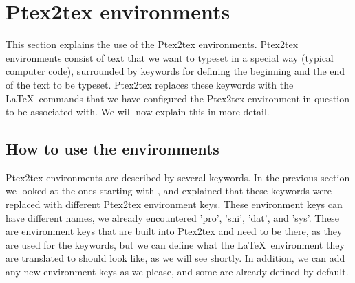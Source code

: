 \documentclass[a4paper,11pt]{article}
\begin{document}
{\section{Ptex2tex environments}\label{sec:config}
This section explains the use of the Ptex2tex
environments. Ptex2tex environments consist of text that we want to
typeset in a special way (typical computer code), surrounded by keywords for
defining the beginning and the end of the text to be
typeset. Ptex2tex replaces these keywords with the \LaTeX~commands
that we have configured the Ptex2tex environment in question to be
associated with. We will now explain this in more detail.

\subsection{How to use the environments}
Ptex2tex environments are described by several keywords. In the
previous section we looked at the ones starting with , and
explained that these keywords were replaced with different Ptex2tex
environment keys. These environment keys can have different names, we already
encountered 'pro', 'sni', 'dat', and 'sys'. These are environment keys that are
built into Ptex2tex and need to be there, as they are used for the
 keywords, but we can define what the \LaTeX~environment they are
translated to should look like, as we
will see shortly. In addition, we can add any new environment keys as we
please, and some are already defined by default.

}
\end{document}
